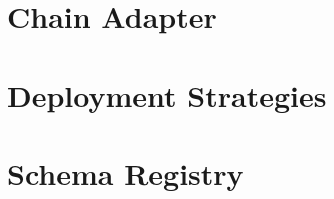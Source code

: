 \section{Chain Adapter} %
\label{sec:chain_adapter}

\section{Deployment Strategies} %
\label{sec:deployment_strategies}

\section{Schema Registry} %
\label{sec:schema_registry}